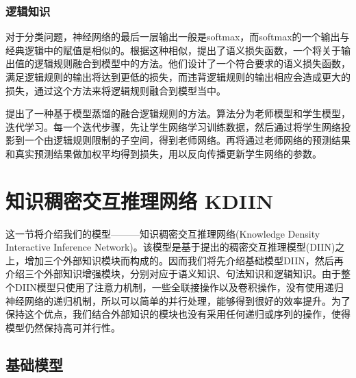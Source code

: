 \documentclass[UTF8,11pt,a4paper,nofonts]{ctexart}
\begin{document}
\subsubsection{逻辑知识}

对于分类问题，神经网络的最后一层输出一般是softmax，而softmax的一个输出与经典逻辑中的赋值是相似的。根据这种相似，\cite{Xu2017ASL}提出了语义损失函数，一个将关于输出值的逻辑规则融合到模型中的方法。他们设计了一个符合要求的语义损失函数，满足逻辑规则的输出将达到更低的损失，而违背逻辑规则的输出相应会造成更大的损失，通过这个方法来将逻辑规则融合到模型当中。

\cite{Hu2016HarnessingDN, Hu2016DeepNN}提出了一种基于模型蒸馏的融合逻辑规则的方法。算法分为老师模型和学生模型，迭代学习。每一个迭代步骤，先让学生网络学习训练数据，然后通过将学生网络投影到一个由逻辑规则限制的子空间，得到老师网络。再将通过老师网络的预测结果和真实预测结果做加权平均得到损失，用以反向传播更新学生网络的参数。






\newpage
\section{知识稠密交互推理网络 KDIIN}

这一节将介绍我们的模型———知识稠密交互推理网络(Knowledge Density Interactive Inference Network)。该模型是基于\cite{yichen2018nli}提出的稠密交互推理模型(DIIN)之上，增加三个外部知识模块而构成的。因而我们将先介绍基础模型DIIN，然后再介绍三个外部知识增强模块，分别对应于语义知识、句法知识和逻辑知识。由于整个DIIN模型只使用了注意力机制，一些全联接操作以及卷积操作，没有使用递归神经网络的递归机制，所以可以简单的并行处理，能够得到很好的效率提升。为了保持这个优点，我们结合外部知识的模块也没有采用任何递归或序列的操作，使得模型仍然保持高可并行性。

\subsection{基础模型}
\end{document}

